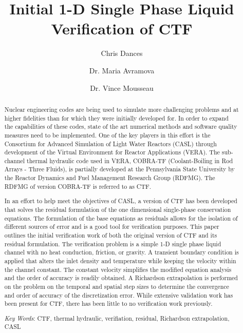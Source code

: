 \documentclass{mc2015}
\begin{document}
\title{Initial 1-D Single Phase Liquid Verification of CTF}

\author{Chris Dances}
\author{Dr. Maria Avramova}

\author{Dr. Vince Mousseau}

\maketitle

\begin{abstract}
Nuclear engineering codes are being used to simulate more challenging problems
and at higher fidelities than for which they were initially developed for. In
order to expand the capabilities of these codes, state of the art numerical methods and
software quality measures need to be implemented. One of the key players in this
effort is the Consortium for Advanced Simulation of Light Water Reactors (CASL) through
development of the Virtual Environment for Reactor Applications (VERA). The
sub-channel thermal hydraulic code used in VERA, COBRA-TF (Coolant-Boiling in
Rod Arrays - Three Fluids), is partially developed at the Pennsylvania State
University by the Reactor Dynamics and Fuel Management Research Group (RDFMG).
The RDFMG of version COBRA-TF is referred to as CTF.

In an effort to help meet the objectives of CASL, a version of CTF has been
developed that solves the residual formulation of the one dimensional 
single-phase conservation equations. The formulation of the base equations as
residuals allows for the isolation of different sources of error and is a
good tool for verification purposes. This paper outlines the initial
verification work of both the original version of CTF and its residual
formulation. The verification problem is a simple 1-D single phase liquid
channel with no heat conduction, friction, or gravity. A transient boundary
condition is applied that alters the inlet density and temperature while keeping
the velocity within the channel constant. The constant velocity simplifies the modified
equation analysis and the order of accuracy is readily obtained. A Richardson
extrapolation is performed on the problem on the temporal and spatial step sizes
to determine the convergence and order of accuracy of the discretization error.
While extensive validation work has been present for CTF, there has been little
to no verification work previously. 

\emph{Key Words}: CTF, thermal hydraulic, verifiation, residual, Richardson
extrapolation, CASL

\end{abstract}
\end{document}
